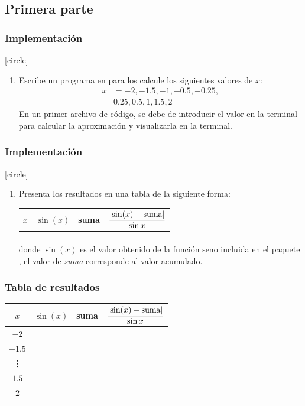 \subsection{Primera parte}
\begin{frame}[fragile]
\frametitle{Implementación}
[circle]
\begin{enumerate}[<+->]
\item Escribe un programa en \python{} para los calcule los siguientes valores de $x$:
\begin{align*}
x &= -2, -1.5, - 1, -0.5, -0.25, \\
& 0.25 , 0.5, 1, 1.5, 2
\end{align*}
En un primer archivo de código, se debe de introducir el valor en la terminal para calcular la aproximación y visualizarla en la terminal.
\seti
\end{enumerate}
\end{frame}
\begin{frame}[fragile]
\frametitle{Implementación}
[circle]
\begin{enumerate}[<+->]
\conti   
\item Presenta los resultados en una tabla de la siguiente forma:
\begin{table}
\fontsize{12}{12}\selectfont
\centering
\begin{tabular}{| c | c | c | c |}
$x$ & $\sin (x) $ & suma & $\dfrac{\abs{\sin(x) - \mbox{suma}}}{\sin x}$ \\ \hline
 & & & \\ \hline
\end{tabular}
\end{table}
donde $\sin (x)$ es el valor obtenido de la función seno incluida en el paquete , el valor de \emph{suma} corresponde al valor acumulado.
\seti
\end{enumerate}
\end{frame}
\begin{frame}[fragile]
\frametitle{Tabla de resultados}
\begin{table}
\centering
\begin{tabular}{| c | c | c | c |}
\hline
$x$ & $\sin (x)$ & suma & $\dfrac{\abs{\sin(x) - \mbox{suma}}}{\sin x}$ \\ \hline
$-2$ & & & \\ \hline
$-1.5$ & & & \\ \hline
\vdots & & & \\ \hline
$1.5$ & & & \\ \hline
$2$ & & & \\ \hline
\end{tabular}
\end{table}
\end{frame}

